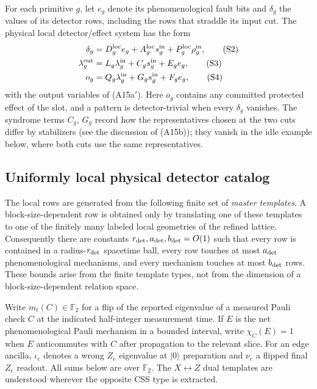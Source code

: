 \documentclass[aps,prx,reprint,superscriptaddress,nofootinbib,floatfix,longbibliography]{revtex4-2}
\theoremstyle{definition}
\begin{document}
For each primitive $g$, let $e_g$ denote its phenomenological fault bits and
$\delta_g$ the values of its detector rows, including the rows that straddle
its input cut.  The physical local detector/effect system has the form
\begin{align}
 \delta_g&=D_g^{\mathrm{loc}}e_g+A_g^{\mathrm{loc}}s_g^{\rm in}
 +P_g^{\mathrm{loc}}\rho_g^{\rm in},\tag{S2}\\
 \lambda_g^{\rm out}&=L_g\lambda_g^{\rm in}+C_gs_g^{\rm in}+E_ge_g,\tag{S3}\\
 o_g&=Q_g\lambda_g^{\rm in}+G_gs_g^{\rm in}+F_ge_g,\tag{S4}
\end{align}
with the output variables of (A15a$'$).  Here $o_g$ contains any committed
protected effect of the slot, and a pattern is detector-trivial when every
$\delta_g$ vanishes.  The syndrome terms $C_g$, $G_g$ record how the
representatives chosen at the two cuts differ by stabilizers (see the
discussion of (A15b)); they vanish in the idle example below, where both cuts
use the same representatives.

\subsection{Uniformly local physical detector catalog}
The local rows are generated from the following finite set of \emph{master
templates}.  A block-size-dependent row is obtained only by translating one
of these templates to one of the finitely many labeled local geometries of
the refined lattice.  Consequently there are constants
$r_{\rm det},a_{\rm det},b_{\rm det}=O(1)$ such that every row is contained in
a radius-$r_{\rm det}$ spacetime ball, every row touches at most
$a_{\rm det}$ phenomenological mechanisms, and every mechanism touches at
most $b_{\rm det}$ rows.  These bounds arise from the finite template types,
not from the dimension of a block-size-dependent relation space.

Write $m_t(C)\in\mathbb F_2$ for a flip of the reported eigenvalue of a
measured Pauli check $C$ at the indicated half-integer measurement time.  If
$E$ is the net phenomenological Pauli mechanism in a bounded interval, write
$\chi_C(E)=1$ when $E$ anticommutes with $C$ after propagation to the relevant
slice.  For an edge ancilla, $\iota_e$ denotes a wrong $Z_e$ eigenvalue at
$|0\rangle$ preparation and $\nu_e$ a flipped final $Z_e$ readout.  All sums
below are over $\mathbb F_2$.  The $X\leftrightarrow Z$ dual templates are
understood wherever the opposite CSS type is extracted.
\end{document}
